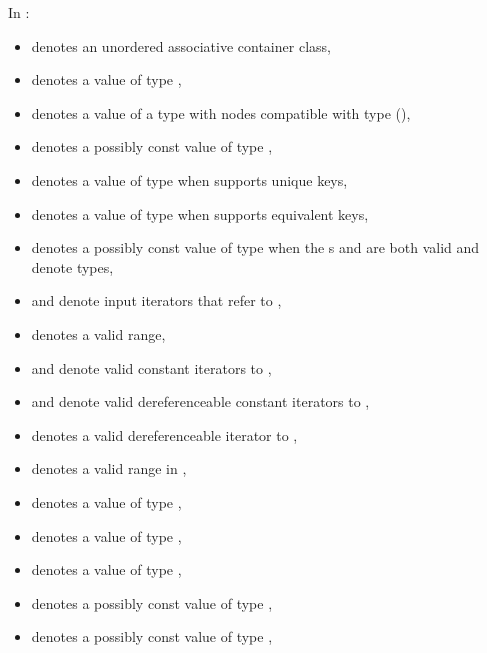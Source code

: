 \pnum
{}%
%
%
%
%
%
In :
\begin{itemize}
\item {} denotes an unordered associative container class,
\item {} denotes a value of type ,
\item {} denotes a value of a type with nodes compatible
  with type  (),
\item {} denotes a possibly const value of type ,
\item {} denotes a value of type 
  when  supports unique keys,
\item {} denotes a value of type 
  when  supports equivalent keys,
\item {} denotes a possibly const value of type 
  when the s
   and
  are both valid and denote types,
\item {} and  denote input iterators
  that refer to ,
\item \tcode{[i, j)} denotes a valid range,
\item {} and  denote valid constant iterators to ,
\item {} and  denote
  valid dereferenceable constant iterators to ,
\item {} denotes a valid dereferenceable iterator to ,
\item \tcode{[q1, q2)} denotes a valid range in ,
\item {} denotes a value of type ,
\item {} denotes a value of type ,
\item {} denotes a value of type ,
\item {} denotes a possibly const value of type ,
\item {} denotes a possibly const value of type ,

\end{itemize}
